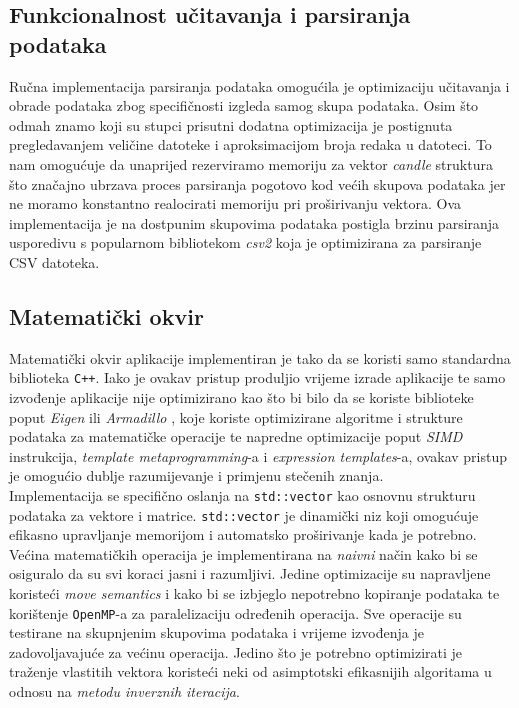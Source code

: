 \documentclass[zavrsnirad]{fer}
\begin{document}
\subsection{Funkcionalnost učitavanja i parsiranja podataka}
Ručna implementacija parsiranja podataka omogućila je
optimizaciju učitavanja i obrade podataka zbog specifičnosti
izgleda samog skupa podataka. Osim što odmah znamo koji su stupci
prisutni dodatna optimizacija je postignuta pregledavanjem veličine
datoteke i aproksimacijom broja redaka u datoteci. To nam omogućuje
da unaprijed rezerviramo memoriju za vektor \emph{candle} struktura
što značajno ubrzava proces parsiranja pogotovo kod većih skupova
podataka jer ne moramo konstantno realocirati memoriju pri proširivanju
vektora. Ova implementacija je na dostpunim skupovima podataka
postigla brzinu parsiranja usporedivu s popularnom bibliotekom
\emph{csv2} \cite{csv2} koja je optimizirana za parsiranje CSV datoteka.

\subsection{Matematički okvir}
\label{sek:matematicki_okvir_rezultati}
Matematički okvir aplikacije implementiran je tako da
se koristi samo standardna biblioteka \texttt{C++}. Iako je ovakav pristup
produljio vrijeme izrade aplikacije te samo izvođenje aplikacije
nije optimizirano kao što bi bilo da se koriste biblioteke poput
\emph{Eigen} \cite{Eigen3} ili \emph{Armadillo} \cite{10980539},
koje koriste optimizirane algoritme i strukture podataka za
matematičke operacije te napredne optimizacije poput \emph{SIMD} instrukcija,
\emph{template metaprogramming}-a i \emph{expression templates}-a,
ovakav pristup je omogućio dublje razumijevanje i primjenu
stečenih znanja.\\
Implementacija se specifično oslanja
na \texttt{std::vector} kao osnovnu strukturu podataka za vektore i
matrice. \texttt{std::vector} je dinamički niz koji omogućuje
efikasno upravljanje memorijom i automatsko proširivanje
kada je potrebno.\\
Većina matematičkih operacija je implementirana na \emph{naivni} način
kako bi se osiguralo da su svi koraci jasni i razumljivi. Jedine
optimizacije su napravljene koristeći \emph{move semantics} i
kako bi se izbjeglo nepotrebno kopiranje podataka te korištenje
\texttt{OpenMP}-a \cite{660313} za paralelizaciju određenih operacija.
Sve operacije su testirane na skupnjenim skupovima podataka i
vrijeme izvođenja je zadovoljavajuće za većinu operacija. Jedino
što je potrebno optimizirati je traženje vlastitih vektora koristeći
neki od asimptotski efikasnijih algoritama u odnosu na \emph{metodu
inverznih iteracija}.
\end{document}
